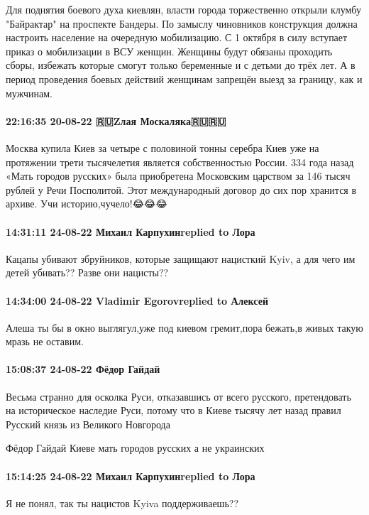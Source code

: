 Для поднятия боевого духа киевлян, власти города торжественно открыли клумбу
"Байрактар" на проспекте Бандеры. По замыслу чиновников конструкция должна
настроить население на очередную мобилизацию. С 1 октября в силу вступает
приказ о мобилизации в ВСУ женщин. Женщины будут обязаны проходить сборы,
избежать которые смогут только беременные и с детьми до трёх лет. А в период
проведения боевых действий женщинам запрещён выезд за границу, как и мужчинам.

\paragraph{22:16:35 20-08-22 🇷🇺Zлая Москаляка🇷🇺🇷🇺}

Москва купила Киев за четыре с половиной тонны серебра
Киев уже на протяжении трети тысячелетия является собственностью России. 334 года назад «Мать городов русских» была приобретена Московским царством за 146 тысяч рублей у Речи Посполитой. Этот международный договор до сих пор хранится в архиве.
Учи историю,чучело!😂😂😂

\paragraph{14:31:11 24-08-22 Михаил Карпухинreplied to Лора}

Кацапы убивают збруйников, которые защищают нацисткий Kyiv, а для чего им детей
убивать?? Разве они нацисты??

\paragraph{14:34:00 24-08-22 Vladimir Egorovreplied to Алексей}

Алеша ты бы в окно выглягул,уже под киевом гремит,пора бежать,в живых такую
мразь не оставим.

\paragraph{15:08:37 24-08-22 Фёдор Гайдай}

Весьма странно для осколка Руси, отказавшись от всего русского, претендовать на
историческое наследие Руси, потому что в Киеве тысячу лет назад правил Русский
князь из Великого Новгорода

Фёдор Гайдай
Киеве мать городов русских а не украинских

\paragraph{15:14:25 24-08-22 Михаил Карпухинreplied to Лора}

Я не понял, так ты нацистов Kyiva поддерживаешь??

